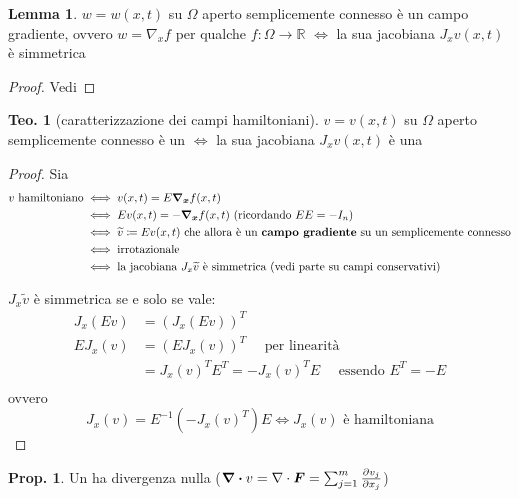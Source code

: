 \documentclass[a4paper,10pt]{article}
\theoremstyle{definition}
\newcommand{\bv}{\boldsymbol} %
\theoremstyle{indentdefinition}
\theoremstyle{indenttheorem}
\newtheorem{thm}{Teo.}
\newtheorem{prop}{Prop.}
\newtheorem{lem*}{Lemma}
\theoremstyle{myremark}
\theoremstyle{indentgeneral}
\newenvironment{myboxed} 
{\noindent\begin{lrbox}{\mybox}\begin{minipage}{\textwidth}}
{\end{minipage}\end{lrbox}\fbox{\usebox{\mybox}}}
\begin{document}
\begin{lem*}
$w=w\left(x,t\right)$ su $\Omega$ aperto semplicemente connesso
è un campo gradiente, ovvero $w=\nabla_{x}f$ per qualche $f\colon\Omega\rightarrow\mathbb{R}$
$\Longleftrightarrow$ la sua jacobiana $J_{x}v\left(x,t\right)$
è simmetrica
\end{lem*}
\begin{proof}
Vedi 
\end{proof}

\begin{myboxed}
\begin{thm}[caratterizzazione dei campi hamiltoniani]
$v=v\left(x,t\right)$ su $\Omega$ aperto semplicemente connesso è
un  $\Longleftrightarrow$ la sua
jacobiana $J_{x}v\left(x,t\right)$ è una 
\end{thm}
\end{myboxed}

\begin{proof}
    Sia
    \begin{align*}
        \text{$v$ hamiltoniano} &\iff v(x,t)=E\grad_{\bv{x}}f(x,t) \\
        &\iff Ev(x,t)=-\grad_{\bv{x}}f(x,t) \text{ (ricordando $EE=-I_n$)} \\
        &\iff \widetilde{v}\coloneqq Ev(x,t) \text{ che allora è un \textbf{campo gradiente} su un semplicemente connesso}  \\
        &\iff \text{irrotazionale} \\
        &\iff \text{la jacobiana $J_x\widetilde{v}$ è simmetrica (vedi parte su campi conservativi)}
    \end{align*}
    
         $J_x\widetilde{v}$ è simmetrica se e solo se vale: 
        \begin{align*}
            J_x(Ev)&=(J_x(Ev))^T \\
            EJ_x(v)&=(EJ_x(v))^T \quad \text{ per linearità} \\
            &=J_x(v)^TE^T=-J_x(v)^TE \quad\text{ essendo $E^T=-E$} \\
        \end{align*}
        ovvero $$J_x(v)=E^{-1}(-J_x(v)^T)E \iff J_x(v) \text{ è hamiltoniana}$$
  
\end{proof}



\begin{prop}
Un  ha divergenza nulla ($\divergence v=\nabla\cdot\boldsymbol{F}=\sum_{j=1}^{m}\frac{\partial v_{j}}{\partial x_{j}}$)
\end{prop}
\end{document}
